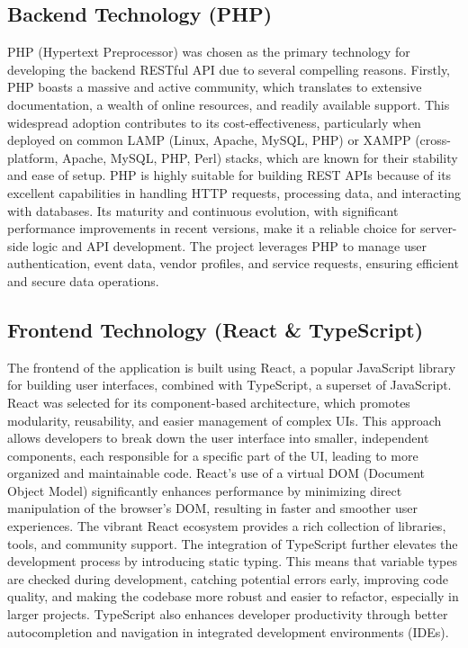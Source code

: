 \documentclass{report}
\begin{document}
\subsection{Backend Technology (PHP)}
PHP (Hypertext Preprocessor) was chosen as the primary technology for developing the backend RESTful API due to several compelling reasons. Firstly, PHP boasts a massive and active community, which translates to extensive documentation, a wealth of online resources, and readily available support. This widespread adoption contributes to its cost-effectiveness, particularly when deployed on common LAMP (Linux, Apache, MySQL, PHP) or XAMPP (cross-platform, Apache, MySQL, PHP, Perl) stacks, which are known for their stability and ease of setup. PHP is highly suitable for building REST APIs because of its excellent capabilities in handling HTTP requests, processing data, and interacting with databases. Its maturity and continuous evolution, with significant performance improvements in recent versions, make it a reliable choice for server-side logic and API development. The project leverages PHP to manage user authentication, event data, vendor profiles, and service requests, ensuring efficient and secure data operations.

\subsection{Frontend Technology (React \& TypeScript)}
The frontend of the application is built using React, a popular JavaScript library for building user interfaces, combined with TypeScript, a superset of JavaScript. React was selected for its component-based architecture, which promotes modularity, reusability, and easier management of complex UIs. This approach allows developers to break down the user interface into smaller, independent components, each responsible for a specific part of the UI, leading to more organized and maintainable code. React's use of a virtual DOM (Document Object Model) significantly enhances performance by minimizing direct manipulation of the browser's DOM, resulting in faster and smoother user experiences. The vibrant React ecosystem provides a rich collection of libraries, tools, and community support. The integration of TypeScript further elevates the development process by introducing static typing. This means that variable types are checked during development, catching potential errors early, improving code quality, and making the codebase more robust and easier to refactor, especially in larger projects. TypeScript also enhances developer productivity through better autocompletion and navigation in integrated development environments (IDEs).
\end{document}
